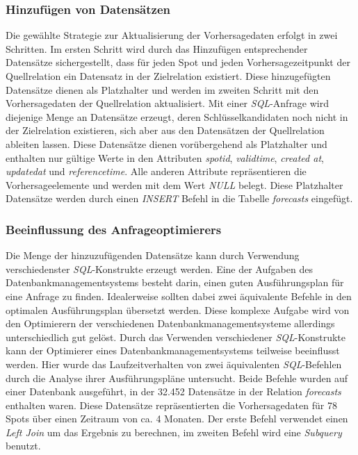 \subsubsection{Hinzufügen von Datensätzen}
Die gewählte Strategie zur Aktualisierung der Vorhersagedaten erfolgt
in zwei Schritten. Im ersten Schritt wird durch das Hinzufügen
entsprechender Datensätze sichergestellt, dass für jeden Spot und
jeden Vorhersagezeitpunkt der Quellrelation ein Datensatz in der
Zielrelation existiert. Diese hinzugefügten Datensätze dienen als
Platzhalter und werden im zweiten Schritt mit den Vorhersagedaten der
Quellrelation aktualisiert. Mit einer \textit{SQL}-Anfrage wird
diejenige Menge an Datensätze erzeugt, deren Schlüsselkandidaten noch
nicht in der Zielrelation existieren, sich aber aus den Datensätzen
der Quellrelation ableiten lassen. Diese Datensätze dienen
vorübergehend als Platzhalter und enthalten nur gültige Werte in den
Attributen \textit{spot\textunderscore id},
\textit{valid\textunderscore time}, \textit{created\textunderscore
  at}, \textit{updated\textunderscore at} und
\textit{reference\textunderscore time}. Alle anderen Attribute
repräsentieren die Vorhersageelemente und werden mit dem Wert
\textit{NULL} belegt. Diese Platzhalter Datensätze werden durch einen
\textit{INSERT} Befehl in die Tabelle \textit{forecasts} eingefügt.

\subsubsection{Beeinflussung des Anfrageoptimierers}
Die Menge der hinzuzufügenden Datensätze kann durch Verwendung
verschiedenster \textit{SQL}-Konstrukte erzeugt werden. Eine der
Aufgaben des Datenbankmanagementsystems besteht darin, einen guten
Ausführungsplan für eine Anfrage zu finden. Idealerweise sollten dabei
zwei äquivalente Befehle in den optimalen Ausführungsplan übersetzt
werden. Diese komplexe Aufgabe wird von den Optimierern der
verschiedenen Datenbankmanagementsysteme allerdings unterschiedlich
gut gelöst. Durch das Verwenden verschiedener \textit{SQL}-Konstrukte
kann der Optimierer eines Datenbankmanagementsystems teilweise
beeinflusst werden. Hier wurde das Laufzeitverhalten von zwei
äquivalenten \textit{SQL}-Befehlen durch die Analyse ihrer
Ausführungspläne untersucht. Beide Befehle wurden auf einer Datenbank
ausgeführt, in der 32.452 Datensätze in der Relation
\textit{forecasts} enthalten waren. Diese Datensätze repräsentierten
die Vorhersagedaten für 78 Spots über einen Zeitraum von ca. 4
Monaten. Der erste Befehl verwendet einen \textit{Left Join} um das
Ergebnis zu berechnen, im zweiten Befehl wird eine \textit{Subquery}
benutzt.

